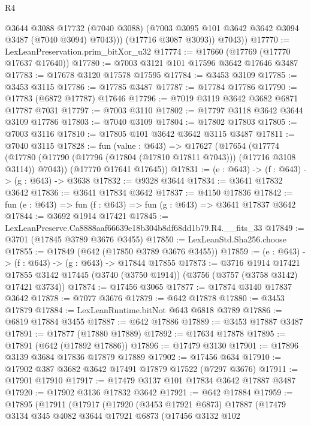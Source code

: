 \begin{lexlean}{R4}
\begin{coremodule}
              @3644
              @3088
              @17732
              (@7040 @3088)
              (@7003 @3095 @101 @3642 @3642 @3094 @3487 (@7040 @3094) @7043)))
          (@17716 @3087 @3093))
        @7043))
@17770 := LexLeanPreservation.prim_bitXor_u32
@17774 := @17660 (@17769 (@17770 @17637 @17640))
@17780 := @7003 @3121 @101 @17596 @3642 @17646 @3487
@17783 := @17678 @3120 @17578 @17595
@17784 := @3453 @3109
@17785 := @3453 @3115
@17786 := @17785 @3487
@17787 := @17784 @17786
@17790 := @17783 (@6872 @17787) @17646
@17796 := @7019 @3119 @3642 @3682 @6871 @17787 @7031
@17797 := @7003 @3110
@17802 := @17797 @3118 @3642 @3644 @3109 @17786
@17803 := @7040 @3109
@17804 := @17802 @17803
@17805 := @7003 @3116
@17810 := @17805 @101 @3642 @3642 @3115 @3487
@17811 := @7040 @3115
@17828 := fun (value : @643) =>
  @17627
    (@17654
      (@17774 (@17780 (@17790 (@17796 (@17804 (@17810 @17811 @7043))) (@17716 @3108 @3114)) @7043))
      (@17770 @17641 @17645))
@17831 := (e : @643) -> (f : @643) -> (g : @643) -> @3638
@17832 := @9328 @3644
@17834 := @3641 @17832 @3642
@17836 := @3641 @17834 @3642
@17837 := @4150 @17836
@17842 := fun (e : @643) => fun (f : @643) => fun (g : @643) => @3641 @17837 @3642
@17844 := @3692 @1914 @17421
@17845 := LexLeanPreserve.Ca8888aaf66639e18b304b8df68dd1b79.R4.__fits_33
@17849 := @3701 (@17845 @3789 @3676 @3455)
@17850 := LexLeanStd.Sha256.choose
@17855 := @17849 (@642 (@17850 @3789 @3676 @3455))
@17859 := (e : @643) -> (f : @643) -> (g : @643) -> @17844 @17855
@17873 := @3716
    @1914
    @17421
    @17855
    @3142
    @17445
    (@3740 (@3750 @1914))
    (@3756 (@3757 (@3758 @3142) @17421 @3734))
@17874 := @17456 @3065
@17877 := @17874 @3140 @17837 @3642
@17878 := @7077 @3676
@17879 := @642 @17878
@17880 := @3453 @17879
@17884 := LexLeanRuntime.bitNot @643 @6818 @3789
@17886 := @6819 @17884 @3455
@17887 := @642 @17886
@17889 := @3453 @17887 @3487
@17891 := @17877 (@17880 @17889)
@17892 := @17634 @17878
@17895 := @17891 (@642 (@17892 @17886))
@17896 := @17479 @3130
@17901 := @17896 @3139 @3684 @17836 @17879 @17889
@17902 := @17456 @634
@17910 := @17902 @387 @3682 @3642 @17491 @17879 @17522 (@7297 @3676)
@17911 := @17901 @17910
@17917 := @17479 @3137 @101 @17834 @3642 @17887 @3487
@17920 := @17902 @3136 @17832 @3642
@17921 := @642 @17884
@17959 := @17895
    (@17911
      (@17917
        (@17920
          (@3453 @17921 @6873)
          @17887
          (@17479
            @3134
            @345
            @4082
            @3644
            @17921
            @6873
            (@17456
              @3132
              @102

\end{coremodule}
\end{lexlean}
